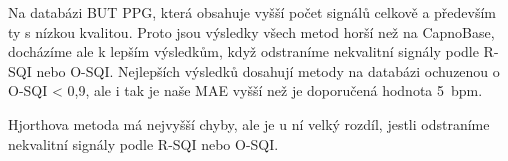 
Na databázi BUT PPG, která obsahuje vyšší počet signálů celkově a především ty s nízkou kvalitou.
Proto jsou výsledky všech metod horší než na CapnoBase, docházíme ale k lepším výsledkům, když odstraníme nekvalitní signály podle R-SQI nebo O-SQI.
Nejlepších výsledků dosahují metody na databázi ochuzenou o O-SQI < 0,9, ale i tak je naše MAE vyšší než je doporučená hodnota 5~\acs{bpm}. %

Hjorthova metoda má nejvyšší chyby, ale je u ní velký rozdíl, jestli odstraníme nekvalitní signály podle R-SQI nebo O-SQI. %



